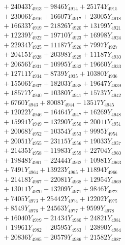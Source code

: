 \documentclass[a4paper,10pt]{article}
\begin{document}
{\begin{align}
&\;  + 24043 Y_{4913} + 9846 Y_{4914} + 25174 Y_{4915} \\[0.3ex]
&\;  + 23006 Y_{4916} + 16607 Y_{4917} + 23005 Y_{4918} \\[0.5ex]\allowbreak
&\;  + 16633 Y_{4919} + 21826 Y_{4920} + 13199 Y_{4921} \\[0.3ex]
&\;  + 12239 Y_{4922} + 19710 Y_{4923} + 16998 Y_{4924} \\[0.3ex]
&\;  + 22934 Y_{4925} + 11187 Y_{4926} + 7997 Y_{4927} \\[0.3ex]
&\;  + 20415 Y_{4928} + 20398 Y_{4929} + 11187 Y_{4930} \\[0.3ex]
&\;  + 20656 Y_{4931} + 10995 Y_{4932} + 19660 Y_{4933} \\[0.3ex]
&\;  + 12711 Y_{4934} + 8739 Y_{4935} + 10380 Y_{4936} \\[0.3ex]
&\;  + 15506 Y_{4937} + 18203 Y_{4938} + 19647 Y_{4939} \\[0.3ex]
&\;  + 18577 Y_{4940} + 10380 Y_{4941} + 15737 Y_{4942} \\[0.3ex]
&\;  + 6760 Y_{4943} + 8008 Y_{4944} + 13517 Y_{4945} \\[0.3ex]
&\;  + 12022 Y_{4946} + 16464 Y_{4947} + 16269 Y_{4948} \\[0.5ex]\allowbreak
&\;  + 15991 Y_{4949} + 13290 Y_{4950} + 20011 Y_{4951} \\[0.3ex]
&\;  + 20068 Y_{4952} + 10354 Y_{4953} + 9995 Y_{4954} \\[0.3ex]
&\;  + 20051 Y_{4955} + 23115 Y_{4956} + 19033 Y_{4957} \\[0.3ex]
&\;  + 21435 Y_{4958} + 11983 Y_{4959} + 22704 Y_{4960} \\[0.3ex]
&\;  + 19848 Y_{4961} + 22444 Y_{4962} + 10981 Y_{4963} \\[0.3ex]
&\;  + 7491 Y_{4964} + 13923 Y_{4965} + 11894 Y_{4966} \\[0.3ex]
&\;  + 21418 Y_{4967} + 22081 Y_{4968} + 12954 Y_{4969} \\[0.3ex]
&\;  + 13011 Y_{4970} + 13209 Y_{4971} + 9846 Y_{4972} \\[0.3ex]
&\;  + 7405 Y_{4973} + 25442 Y_{4974} + 12202 Y_{4975} \\[0.3ex]
&\;  + 8549 Y_{4976} + 24563 Y_{4977} + 9599 Y_{4978} \\[0.5ex]\allowbreak
&\;  + 16040 Y_{4979} + 21434 Y_{4980} + 24821 Y_{4981} \\[0.3ex]
&\;  + 19961 Y_{4982} + 20595 Y_{4983} + 23890 Y_{4984} \\[0.3ex]
&\;  + 20836 Y_{4985} + 20579 Y_{4986} + 21582 Y_{4987} \\[0.3ex]

\end{align}}
\end{document}
